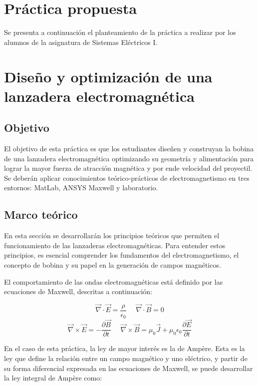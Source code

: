 \section{Práctica propuesta}
\label{sec:practica}

Se presenta a continuación el planteamiento de la práctica a realizar por los alumnos de la asignatura de Sistemas Eléctricos I.

\newpage

\section*{Diseño y optimización de una lanzadera electromagnética}

\subsection*{Objetivo}

El objetivo de esta práctica es que los estudiantes diseñen y construyan la bobina de una lanzadera electromagnética optimizando su geometría y alimentación para lograr la mayor fuerza de atracción magnética y por ende velocidad del proyectil. Se deberán aplicar conocimientos teórico-prácticos de electromagnetismo en tres entornos: MatLab, ANSYS Maxwell y laboratorio.

\subsection*{Marco teórico}

En esta sección se desarrollarán los principios teóricos que permiten el funcionamiento de las lanzaderas electromagnéticas. Para entender estos principios, es esencial comprender los fundamentos del electromagnetismo, el concepto de bobina y su papel en la generación de campos magnéticos.

El comportamiento de las ondas electromagnéticas está definido por las ecuaciones de Maxwell, descritas a continuación:
\begin{figure}[H]
    \centering
    \[
    \vec{\nabla}\cdot \vec{E}= \frac{\rho}{\epsilon_0}~~~~~~\vec{\nabla}\cdot \vec{B}= 0
    \]
    \[
    \vec{\nabla}\times\vec{E}=-\frac{\partial\vec{B}}{\partial t}~~~~~~\vec{\nabla}\times \vec{B}=\mu_0\vec{J}+\mu_0\epsilon_0\frac{\partial \vec{E}}{\partial t}
    \]
\end{figure}

En el caso de esta práctica, la ley de mayor interés es la de Ampère. Esta es la ley que define la relación entre un campo magnético y uno eléctrico, y partir de su forma diferencial expresada en las ecuaciones de Maxwell, se puede desarrollar la ley integral de Ampère como:

